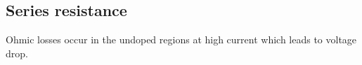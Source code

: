 \documentclass[a4paper, fontsize=8pt, landscape, DIV=1]{scrartcl}
\begin{document}
\begin{multicols*}{4}
    \subsection{Series resistance}
    Ohmic losses occur in the undoped regions at high current which leads to voltage drop.



\end{multicols*}

\setcounter{secnumdepth}{2}
\end{document}

